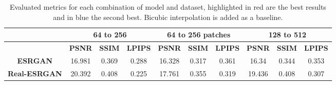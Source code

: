 \begin{table}[H]
  \caption{Evaluated metrics for each combination of model and dataset, highlighted in red are the best results and in blue the second best. Bicubic interpolation is added as a baseline.}
  \label{tab:metrics}
  \begin{adjustbox}{max width=\textwidth}
  \begin{tabular}{c|ccc|ccc|ccc|}
  \cline{2-10}
  \rowcolor[HTML]{C0C0C0}
  \cellcolor[HTML]{FFFFFF}                                                                       & \multicolumn{3}{c|}{\cellcolor[HTML]{C0C0C0}\textbf{64 to 256}}                                                                                        & \multicolumn{3}{c|}{\cellcolor[HTML]{C0C0C0}\textbf{64 to 256 patches}}                                                                                & \multicolumn{3}{c|}{\cellcolor[HTML]{C0C0C0}\textbf{128 to 512}}                                                                                       \\ \hline
  \rowcolor[HTML]{C0C0C0}
  \multicolumn{1}{|c|}{\cellcolor[HTML]{C0C0C0}\textbf{Model}}                                   & \multicolumn{1}{c|}{\cellcolor[HTML]{C0C0C0}\textbf{PSNR}} & \multicolumn{1}{c|}{\cellcolor[HTML]{C0C0C0}\textbf{SSIM}} & \textbf{LPIPS}               & \multicolumn{1}{c|}{\cellcolor[HTML]{C0C0C0}\textbf{PSNR}} & \multicolumn{1}{c|}{\cellcolor[HTML]{C0C0C0}\textbf{SSIM}} & \textbf{LPIPS}               & \multicolumn{1}{c|}{\cellcolor[HTML]{C0C0C0}\textbf{PSNR}} & \multicolumn{1}{c|}{\cellcolor[HTML]{C0C0C0}\textbf{SSIM}} & \textbf{LPIPS}               \\ \hline
  \multicolumn{1}{|c|}{\textbf{ESRGAN}}                                                          & \multicolumn{1}{c|}{16.981}                                & \multicolumn{1}{c|}{0.369}                                 & {\color[HTML]{3531FF} 0.288} & \multicolumn{1}{c|}{16.328}                                & \multicolumn{1}{c|}{0.317}                                 & {\color[HTML]{3531FF} 0.361} & \multicolumn{1}{c|}{16.34}                                 & \multicolumn{1}{c|}{0.344}                                 & {\color[HTML]{3531FF} 0.353} \\ \hline
  \multicolumn{1}{|c|}{\textbf{Real-ESRGAN}}                                                     & \multicolumn{1}{c|}{20.392}                                & \multicolumn{1}{c|}{0.408}                                 & {\color[HTML]{FE0000} 0.225} & \multicolumn{1}{c|}{17.761}                                & \multicolumn{1}{c|}{0.355}                                 & {\color[HTML]{FE0000} 0.319} & \multicolumn{1}{c|}{{\color[HTML]{3531FF} 19.436}}         & \multicolumn{1}{c|}{{\color[HTML]{3531FF} 0.408}}          & {\color[HTML]{FE0000} 0.307} \\ \hline

\end{tabular}
\end{adjustbox}
\end{table}
